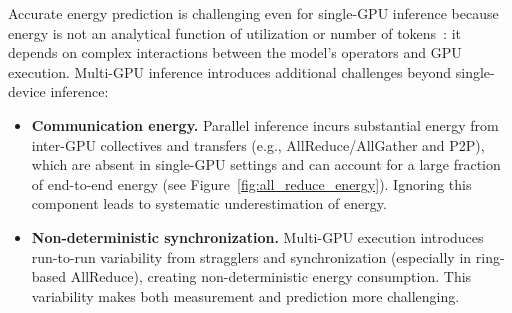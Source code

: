 Accurate energy prediction is challenging even for single-GPU inference because energy is not an analytical
function of utilization or number of tokens~\cite{sustainlp}: it depends on complex interactions between the model’s operators and GPU execution. Multi-GPU inference introduces additional
challenges beyond single-device inference:
\begin{itemize}
\item \textbf{Communication energy.}
Parallel inference incurs substantial energy from inter-GPU collectives and transfers (e.g., AllReduce/AllGather and P2P),
which are absent in single-GPU settings and can account for a large fraction of end-to-end energy (see Figure~\ref{fig:all_reduce_energy}).
Ignoring this component leads to systematic underestimation of energy.

\item \textbf{Non-deterministic synchronization.}
Multi-GPU execution introduces run-to-run variability from stragglers and synchronization (especially in ring-based AllReduce), creating non-deterministic energy consumption. This
variability makes both measurement and prediction more challenging.%
\end{itemize}







